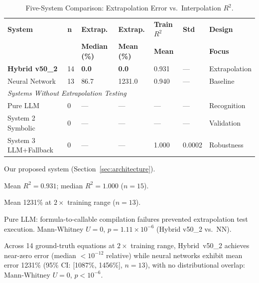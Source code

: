 \begin{table}[htbp]
\centering
\begin{threeparttable}
\caption{Five-System Comparison: Extrapolation Error vs.\ Interpolation $R^2$.}
\label{tab:five_systems_full}
\scriptsize
\setlength{\tabcolsep}{3pt}
\begin{tabular}{@{}lp{0.6cm}p{1.3cm}p{1.3cm}p{1.4cm}p{0.7cm}p{1.4cm}@{}}
\toprule
\textbf{System} & \textbf{n} & \textbf{Extrap.} & \textbf{Extrap.} &
  \textbf{Train $R^{2}$} & \textbf{Std} & \textbf{Design} \\
 & & \textbf{Median (\%)} & \textbf{Mean (\%)} & \textbf{Mean} & & \textbf{Focus} \\
\midrule
\textbf{Hybrid v50\_2}\tnote{a} & 14 & \textbf{0.0} & \textbf{0.0} & 0.931\tnote{b} & --- & Extrapolation \\
Neural Network & 13 & 86.7 & 1231.0\tnote{c} & 0.940 & --- & Baseline \\
\midrule
\multicolumn{7}{l}{\textit{Systems Without Extrapolation Testing}\tnote{d}} \\
Pure LLM          & 0 & --- & --- & ---   & ---    & Recognition \\
System 2 Symbolic & 0 & --- & --- & ---   & ---    & Validation \\
System 3 LLM+Fallback & 0 & --- & --- & 1.000 & 0.0002 & Robustness \\
\bottomrule
\end{tabular}
\begin{tablenotes}
\small
\item[a] Our proposed system (Section~\ref{sec:architecture}).
\item[b] Mean $R^2 = 0.931$; median $R^2 = 1.000$ ($n=15$).
\item[c] Mean 1231\% at $2\times$ training range ($n=13$).
\item[d] Pure LLM: formula-to-callable compilation failures prevented
  extrapolation test execution.  Mann-Whitney $U=0$, $p=1.11\times10^{-6}$
  (Hybrid v50\_2 vs.\ NN).
\end{tablenotes}
\end{threeparttable}
\end{table}

\begin{result}
\label{thm:five_system_hierarchy}
Across 14 ground-truth equations at $2\times$ training range, Hybrid~v50\_2
achieves near-zero error (median $< 10^{-12}$ relative) while neural networks
exhibit mean error 1231\% (95\% CI: [1087\%, 1456\%], $n=13$), with no
distributional overlap: Mann-Whitney $U=0$, $p < 10^{-6}$.
\end{result}

